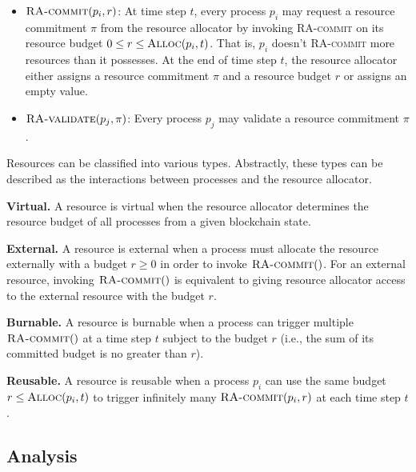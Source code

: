 \documentclass[12pt,draftcls,onecolumn]{IEEEtran}
\newcommand{\Alloc}{\textsc{Alloc}}
\begin{document}
\begin{itemize}
    \item $\textsc{RA-commit}(p_i, r)$: At time step $t$, every process $p_i$ may request a resource commitment $\pi$ from the resource allocator
    by invoking \textsc{RA-commit} on its resource budget $0 \le r \le \Alloc(p_i, t)$. That is, $p_i$ doesn't \textsc{RA-commit} more resources than it possesses. At the end of time step $t$, the resource allocator either assigns a resource commitment $\pi$ and a resource budget $r$ or assigns an empty value.

    \item $\textsc{RA-validate}(p_j, \pi)$: Every process $p_j$ may validate a resource commitment $\pi$.
\end{itemize}

Resources can be classified into various types. Abstractly, these types can be described as the interactions between processes and the resource allocator.

{\bf Virtual.} A resource is virtual when the resource allocator determines the resource budget of all processes from a given blockchain state.

{\bf External.} A resource is external when a process must allocate the resource externally with a budget $r \ge 0$ in order to invoke $\textsc{RA-commit}()$.
For an external resource, invoking $\textsc{RA-commit}()$ is equivalent to giving resource allocator access to the external resource with the budget $r$.

{\bf Burnable.} A resource is burnable when a process can trigger multiple $\textsc{RA-commit}()$ at a time step $t$ subject to the budget $r$ (i.e., the sum of its committed budget is no greater than $r$).

{\bf Reusable.} A resource is reusable when a process $p_i$ can use the same budget $r \le \Alloc(p_i, t)$ to trigger infinitely many $\textsc{RA-commit}(p_i, r)$ at each time step $t$.


\subsection{Analysis}
\end{document}
